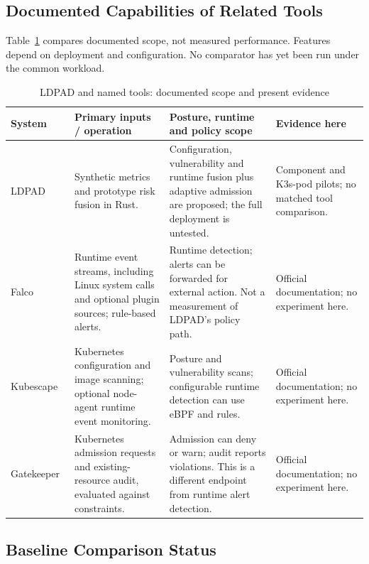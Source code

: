 \documentclass{ieeeaccess}
\renewcommand{\textbf}[1]{#1}
\begin{document}
\subsection{Documented Capabilities of Related Tools}
\label{subsec:toolreview}

Table~\ref{tab:toolreview} compares documented scope, not measured performance. Features depend on deployment and configuration. No comparator has yet been run under the common workload.

\begin{table}[t]
\caption{LDPAD and named tools: documented scope and present evidence}
\label{tab:toolreview}
\centering\footnotesize\setlength{\tabcolsep}{4pt}\renewcommand{\arraystretch}{1.22}
\begin{tabular}{@{}p{}p{}p{}p{}@{}}\toprule
\textbf{System} & \textbf{Primary inputs / operation} & \textbf{Posture, runtime and policy scope} & \textbf{Evidence here} \\ \midrule
LDPAD & Synthetic metrics and prototype risk fusion in Rust. & Configuration, vulnerability and runtime fusion plus adaptive admission are proposed; the full deployment is untested. & Component and K3s-pod pilots; no matched tool comparison. \\
Falco~\cite{b_falco} & Runtime event streams, including Linux system calls and optional plugin sources; rule-based alerts. & Runtime detection; alerts can be forwarded for external action. Not a measurement of LDPAD's policy path. & Official documentation; no experiment here. \\
Kubescape~\cite{b_kubescape,b_kubescape_runtime} & Kubernetes configuration and image scanning; optional node-agent runtime event monitoring. & Posture and vulnerability scans; configurable runtime detection can use eBPF and rules. & Official documentation; no experiment here. \\
Gatekeeper~\cite{b_gatekeeper} & Kubernetes admission requests and existing-resource audit, evaluated against constraints. & Admission can deny or warn; audit reports violations. This is a different endpoint from runtime alert detection. & Official documentation; no experiment here. \\
\bottomrule\end{tabular}
\end{table}

\subsection{Baseline Comparison Status}
\label{subsec:baseline_results}
\end{document}
